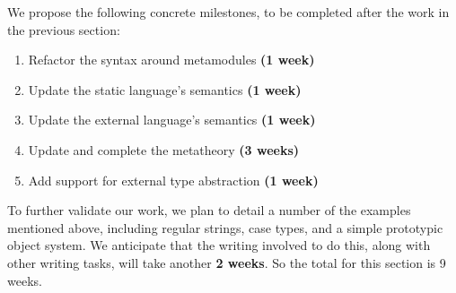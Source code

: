 We propose the following concrete milestones, to be completed after the work in the previous section:
\begin{enumerate}
\item Refactor the syntax around metamodules \textbf{(1 week)}
\item Update the static language's semantics \textbf{(1 week)}
\item Update the external language's semantics \textbf{(1 week)}
\item Update and complete the metatheory \textbf{(3 weeks)}
\item Add support for external type abstraction \textbf{(1 week)}
\end{enumerate}

To further validate our work, we plan to detail a number of the examples mentioned above, including regular strings, case types, and a simple prototypic object system. We anticipate that the writing involved to do this, along with other writing tasks, will take another \textbf{2 weeks}. So the total for this section is 9 weeks.

